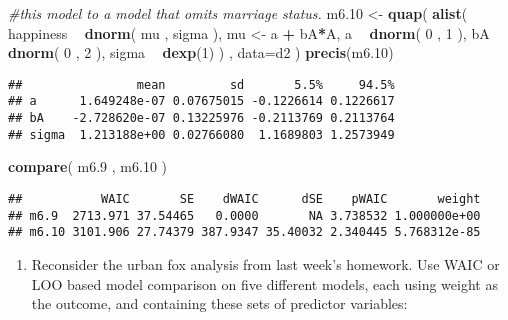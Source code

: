 \documentclass[
]{article}
\newenvironment{Shaded}{\begin{snugshade}}{\end{snugshade}}
\newcommand{\CommentTok}[1]{\textcolor[rgb]{0.56,0.35,0.01}{\textit{#1}}}
\newcommand{\DataTypeTok}[1]{\textcolor[rgb]{0.13,0.29,0.53}{#1}}
\newcommand{\DecValTok}[1]{\textcolor[rgb]{0.00,0.00,0.81}{#1}}
\newcommand{\FloatTok}[1]{\textcolor[rgb]{0.00,0.00,0.81}{#1}}
\newcommand{\KeywordTok}[1]{\textcolor[rgb]{0.13,0.29,0.53}{\textbf{#1}}}
\newcommand{\NormalTok}[1]{#1}
\newcommand{\OperatorTok}[1]{\textcolor[rgb]{0.81,0.36,0.00}{\textbf{#1}}}
\newcommand{\StringTok}[1]{\textcolor[rgb]{0.31,0.60,0.02}{#1}}
\providecommand{\tightlist}{%
  \setlength{\itemsep}{0pt}\setlength{\parskip}{0pt}}
\begin{document}
\begin{Shaded}
\begin{Highlighting}[]
\CommentTok{#this model to a model that omits marriage status.}
\NormalTok{m6}\FloatTok{.10}\NormalTok{ <-}\StringTok{ }\KeywordTok{quap}\NormalTok{(}
    \KeywordTok{alist}\NormalTok{(}
\NormalTok{        happiness }\OperatorTok{~}\StringTok{ }\KeywordTok{dnorm}\NormalTok{( mu , sigma ),}
\NormalTok{        mu <-}\StringTok{ }\NormalTok{a }\OperatorTok{+}\StringTok{ }\NormalTok{bA}\OperatorTok{*}\NormalTok{A,}
\NormalTok{        a }\OperatorTok{~}\StringTok{ }\KeywordTok{dnorm}\NormalTok{( }\DecValTok{0}\NormalTok{ , }\DecValTok{1}\NormalTok{ ),}
\NormalTok{        bA }\OperatorTok{~}\StringTok{ }\KeywordTok{dnorm}\NormalTok{( }\DecValTok{0}\NormalTok{ , }\DecValTok{2}\NormalTok{ ),}
\NormalTok{        sigma }\OperatorTok{~}\StringTok{ }\KeywordTok{dexp}\NormalTok{(}\DecValTok{1}\NormalTok{)}
\NormalTok{    ) , }\DataTypeTok{data=}\NormalTok{d2 )}
\KeywordTok{precis}\NormalTok{(m6}\FloatTok{.10}\NormalTok{)}
\end{Highlighting}
\end{Shaded}

\begin{verbatim}
##                mean         sd       5.5%     94.5%
## a      1.649248e-07 0.07675015 -0.1226614 0.1226617
## bA    -2.728620e-07 0.13225976 -0.2113769 0.2113764
## sigma  1.213188e+00 0.02766080  1.1689803 1.2573949
\end{verbatim}

\begin{Shaded}
\begin{Highlighting}[]
 \KeywordTok{compare}\NormalTok{( m6}\FloatTok{.9}\NormalTok{ , m6}\FloatTok{.10}\NormalTok{ )}
\end{Highlighting}
\end{Shaded}

\begin{verbatim}
##           WAIC       SE    dWAIC      dSE    pWAIC       weight
## m6.9  2713.971 37.54465   0.0000       NA 3.738532 1.000000e+00
## m6.10 3101.906 27.74379 387.9347 35.40032 2.340445 5.768312e-85
\end{verbatim}

\begin{enumerate}
\def\labelenumi{\arabic{enumi}.}
\setcounter{enumi}{2}
\tightlist
\item
  Reconsider the urban fox analysis from last week's homework. Use WAIC
  or LOO based model comparison on five different models, each using
  weight as the outcome, and containing these sets of predictor
  variables:
\end{enumerate}
\end{document}
